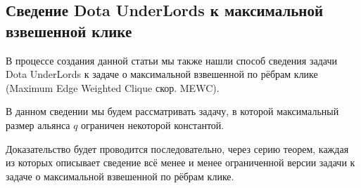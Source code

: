 \documentclass{article}
\begin{document}
\subsection{Сведение Dota UnderLords к максимальной взвешенной клике}
В процессе создания данной статьи мы также нашли способ сведения задачи Dota UnderLords к задаче о максимальной взвешенной по рёбрам клике  (Maximum Edge Weighted Clique скор. MEWC). 

В данном сведении мы будем рассматривать задачу, в которой максимальный размер альянса $q$ ограничен некоторой константой.

Доказательство будет проводится последовательно, через серию теорем, каждая из которых описывает сведение всё менее и менее ограниченной версии задачи к задаче о максимальной взвешенной по рёбрам клике.



%
%
%
\end{document}
